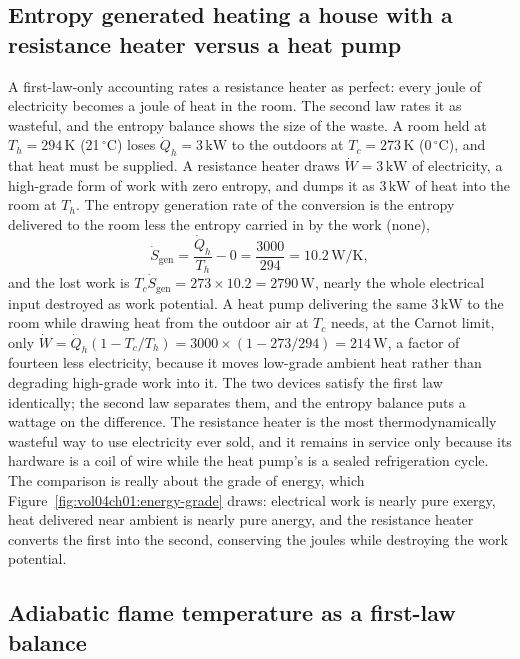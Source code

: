 \subsection{Entropy generated heating a house with a resistance heater
versus a heat pump}

A first-law-only accounting rates a resistance heater as perfect: every joule
of electricity becomes a joule of heat in the room. The second law rates it
as wasteful, and the entropy balance shows the size of the waste. A room held
at $T_h = 294\,\si{\kelvin}$ (21\,$^{\circ}\mathrm{C}$) loses
$\dot Q_h = 3\,\text{kW}$ to the outdoors at $T_c = 273\,\si{\kelvin}$
(0\,$^{\circ}\mathrm{C}$), and that heat must be supplied. A resistance heater
draws $\dot W = 3\,\text{kW}$ of electricity, a high-grade form of work with
zero entropy, and dumps it as $3\,\text{kW}$ of heat into the room at
$T_h$. The entropy generation rate of the conversion is the entropy delivered
to the room less the entropy carried in by the work (none),
\[
\dot S_{\text{gen}} = \frac{\dot Q_h}{T_h} - 0 =
\frac{3000}{294} = 10.2\,\text{W}/\si{\kelvin},
\]
and the lost work is $T_c \dot S_{\text{gen}} = 273 \times 10.2 =
2790\,\text{W}$, nearly the whole electrical input destroyed as work
potential. A heat pump delivering the same $3\,\text{kW}$ to the room while
drawing heat from the outdoor air at $T_c$ needs, at the Carnot limit, only
$\dot W = \dot Q_h (1 - T_c/T_h) = 3000 \times (1 - 273/294) = 214\,\text{W}$,
a factor of fourteen less electricity, because it moves low-grade ambient heat
rather than degrading high-grade work into it. The two devices satisfy the
first law identically; the second law separates them, and the entropy balance
puts a wattage on the difference. The resistance heater is the most
thermodynamically wasteful way to use electricity ever sold, and it remains in
service only because its hardware is a coil of wire while the heat pump's is a
sealed refrigeration cycle. The comparison is really about the grade of energy,
which Figure~\ref{fig:vol04ch01:energy-grade} draws: electrical work is nearly
pure exergy, heat delivered near ambient is nearly pure anergy, and the resistance
heater converts the first into the second, conserving the joules while destroying
the work potential.



\subsection{Adiabatic flame temperature as a first-law balance}

